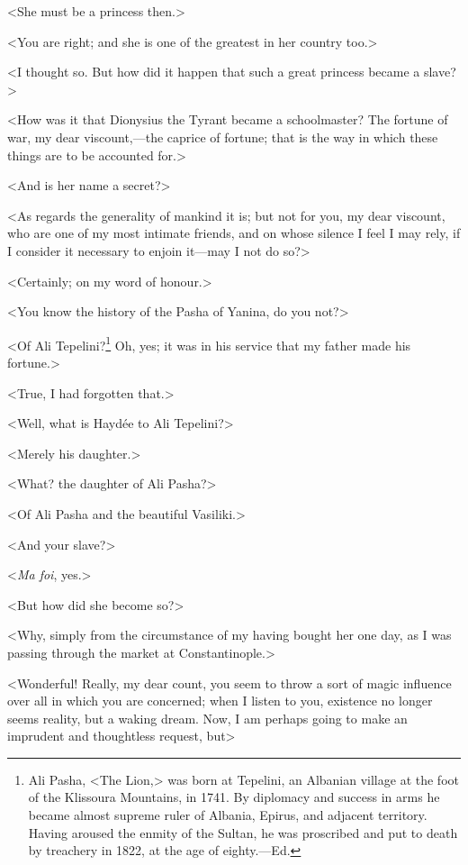  <She must be a princess then.> 

 <You are right; and she is one of the greatest in her country too.> 

 <I thought so. But how did it happen that such a great princess became a slave?> 

 <How was it that Dionysius the Tyrant became a schoolmaster? The fortune of war, my dear viscount,—the caprice of fortune; that is the way in which these things are to be accounted for.> 

 <And is her name a secret?> 

 <As regards the generality of mankind it is; but not for you, my dear viscount, who are one of my most intimate friends, and on whose silence I feel I may rely, if I consider it necessary to enjoin it—may I not do so?> 

 <Certainly; on my word of honour.> 

 <You know the history of the Pasha of Yanina, do you not?> 

 <Of Ali Tepelini?\footnote{Ali Pasha, <The Lion,> was born at Tepelini, an Albanian village at the foot of the Klissoura Mountains, in 1741. By diplomacy and success in arms he became almost supreme ruler of Albania, Epirus, and adjacent territory. Having aroused the enmity of the Sultan, he was proscribed and put to death by treachery in 1822, at the age of eighty.—Ed.} Oh, yes; it was in his service that my father made his fortune.> 

 <True, I had forgotten that.>

<Well, what is Haydée to Ali Tepelini?> 

 <Merely his daughter.> 

 <What? the daughter of Ali Pasha?> 

 <Of Ali Pasha and the beautiful Vasiliki.> 

 <And your slave?> 

 <\textit{Ma foi}, yes.> 

 <But how did she become so?> 

 <Why, simply from the circumstance of my having bought her one day, as I was passing through the market at Constantinople.> 

 <Wonderful! Really, my dear count, you seem to throw a sort of magic influence over all in which you are concerned; when I listen to you, existence no longer seems reality, but a waking dream. Now, I am perhaps going to make an imprudent and thoughtless request, but\longdash> 

